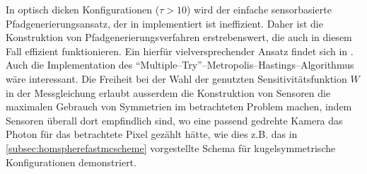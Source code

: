 	In optisch dicken Konfigurationen ($\tau>10$) wird der einfache sensorbasierte Pfadgenerierungsansatz, der in \pirate implementiert ist ineffizient. Daher ist die Konstruktion von Pfadgenerierungsverfahren erstrebenswert, die auch in diesem Fall effizient funktionieren. Ein hierfür vielversprechender Ansatz findet sich in \citep{Laszlo:2005p11056,DAldous:1994p11528,Grassberger:2002p10876}. Auch die Implementation des ``Multiple--Try''--Metropolis--Hastings--Algorithmus \citep{Liu:2000p8427} wäre interessant. Die Freiheit bei der Wahl der genutzten Sensitivitätsfunktion $W$ in der Messgleichung erlaubt ausserdem die Konstruktion von Sensoren die maximalen Gebrauch von Symmetrien im betrachteten Problem machen, indem Sensoren überall dort empfindlich sind, wo eine passend gedrehte Kamera das Photon für das betrachtete Pixel gezählt hätte, wie dies z.B. das in \ref{subsec:homspherefastmcscheme} vorgestellte Schema für kugelsymmetrische Konfigurationen demonstriert.

	